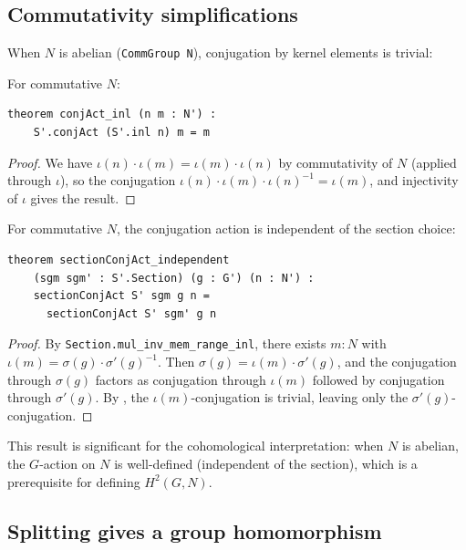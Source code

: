\documentclass[11pt]{article}
\newcommand{\lean}[1]{\texttt{#1}}
\begin{document}
\subsection{Commutativity simplifications}\label{sec:comm-simplify}

When $N$ is abelian (\lean{CommGroup N}), conjugation by kernel elements is trivial:

\begin{theorem}\label{thm:conj-inl}
For commutative $N$:
\begin{lstlisting}
theorem conjAct_inl (n m : N') :
    S'.conjAct (S'.inl n) m = m
\end{lstlisting}
\end{theorem}

\begin{proof}
We have $\iota(n) \cdot \iota(m) = \iota(m) \cdot \iota(n)$ by commutativity of
$N$ (applied through $\iota$), so the conjugation $\iota(n) \cdot \iota(m) \cdot
\iota(n)^{-1} = \iota(m)$, and injectivity of $\iota$ gives the result.
\end{proof}

\begin{theorem}\label{thm:conj-independent}
For commutative $N$, the conjugation action is independent of the section choice:
\begin{lstlisting}
theorem sectionConjAct_independent
    (sgm sgm' : S'.Section) (g : G') (n : N') :
    sectionConjAct S' sgm g n =
      sectionConjAct S' sgm' g n
\end{lstlisting}
\end{theorem}

\begin{proof}
By \lean{Section.mul\_inv\_mem\_range\_inl}, there exists $m : N$ with
$\iota(m) = \sigma(g) \cdot \sigma'(g)^{-1}$.  Then $\sigma(g) = \iota(m) \cdot
\sigma'(g)$, and the conjugation through $\sigma(g)$ factors as conjugation through
$\iota(m)$ followed by conjugation through $\sigma'(g)$.  By
, the $\iota(m)$-conjugation is trivial, leaving only the
$\sigma'(g)$-conjugation.
\end{proof}

This result is significant for the cohomological interpretation: when $N$ is abelian,
the $G$-action on $N$ is well-defined (independent of the section), which is a
prerequisite for defining $H^2(G, N)$.

\subsection{Splitting gives a group homomorphism}\label{sec:split-hom}
\end{document}
